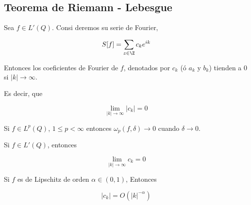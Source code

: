 \subsection{Teorema de Riemann - Lebesgue}

\begin{teo}
    Sea $f \in L'(Q)$. Consi deremos su serie de Fourier,

    \[
        S[f] = \sum_{z \in \Z} c_k e^{ik}
    \]

    Entonces los coeficientes de Fourier de $f$, denotados por $c_k$ (ó $a_k$ y $b_k$) tienden a $0$ si $|k| \to \infty$.

    Es decir, que

    \[
    \lim_{|k| \to \infty} |c_k| = 0
    \]
\end{teo}

\begin{teo}
    Si $f \in L^p(Q)$, $1 \leq p < \infty$ entonces $\omega_p (f, \delta) \to 0$ cuando $\delta \to 0$.
\end{teo}

\begin{cor}
    Si $f \in L'(Q)$, entonces

    \[
        \lim_{|k| \to \infty} c_k = 0
    \]
\end{cor}

\begin{cor}
    Si $f$ es de Lipschitz de orden $\alpha \in (0,1)$, Entonces

    \[
        |c_k|  = O(|k|^{-\alpha})
    \]
\end{cor}

